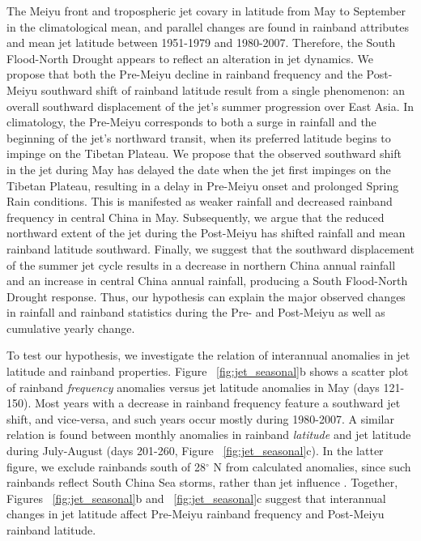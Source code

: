 	The Meiyu front and tropospheric jet covary in latitude from May to September in the climatological mean, and parallel changes are found in rainband attributes and mean jet latitude between 1951-1979 and 1980-2007. Therefore, the South Flood-North Drought appears to reflect an alteration in jet dynamics. We propose that both the Pre-Meiyu decline in rainband frequency and the Post-Meiyu southward shift of rainband latitude result from a single phenomenon: an overall southward displacement of the jet's summer progression over East Asia. In climatology, the Pre-Meiyu corresponds to both a surge in rainfall and the beginning of the jet's northward transit, when its preferred latitude begins to impinge on the Tibetan Plateau. We propose that the observed southward shift in the jet during May has delayed the date when the jet first impinges on the Tibetan Plateau, resulting in a delay in Pre-Meiyu onset and prolonged Spring Rain conditions. This is manifested as weaker rainfall and decreased rainband frequency in central China in May. Subsequently, we argue that the reduced northward extent of the jet during the Post-Meiyu has shifted rainfall and mean rainband latitude southward. Finally, we suggest that the southward displacement of the summer jet cycle results in a decrease in northern China annual rainfall and an increase in central China annual rainfall, producing a South Flood-North Drought response. Thus, our hypothesis can explain the major observed changes in rainfall and rainband statistics during the Pre- and Post-Meiyu as well as cumulative yearly change.
	
	To test our hypothesis, we investigate the relation of interannual anomalies in jet latitude and rainband properties. Figure ~\ref{fig:jet_seasonal}b shows a scatter plot of rainband \textit{frequency} anomalies versus jet latitude anomalies in May (days 121-150). Most years with a decrease in rainband frequency feature a southward jet shift, and vice-versa, and such years occur mostly during 1980-2007. A similar relation is found between monthly anomalies in rainband \textit{latitude} and jet latitude during July-August (days 201-260, Figure ~\ref{fig:jet_seasonal}c). In the latter figure, we exclude rainbands south of 28$^{\circ}$ N from calculated anomalies, since such rainbands reflect South China Sea storms, rather than jet influence \citep{Day2015}. Together, Figures ~\ref{fig:jet_seasonal}b and ~\ref{fig:jet_seasonal}c suggest that interannual changes in jet latitude affect Pre-Meiyu rainband frequency and Post-Meiyu rainband latitude.
	
